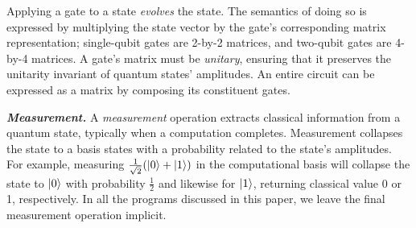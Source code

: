 
Applying a gate to a state \emph{evolves} the state. The semantics of doing so is expressed by multiplying the state vector by the gate's corresponding matrix representation; single-qubit gates are 2-by-2 matrices, and two-qubit gates are 4-by-4 matrices. A gate's matrix must be \emph{unitary}, ensuring that it preserves the unitarity invariant of quantum states' amplitudes. An entire circuit can be expressed as a matrix by composing its constituent gates.

\noindent\textbf{\textit{Measurement.}} A \emph{measurement} operation extracts classical information from a quantum state, typically when a computation completes. Measurement collapses the state to a basis states with a probability related to the state's amplitudes. For example, measuring $\frac{1}{\sqrt{2}}(\ket{0} + \ket{1})$ in the computational basis will collapse the state to $\ket{0}$ with probability $\frac{1}{2}$ and likewise for $\ket{1}$, returning classical value 0 or 1, respectively. In all the programs discussed in this paper, we leave the final measurement operation implicit.

